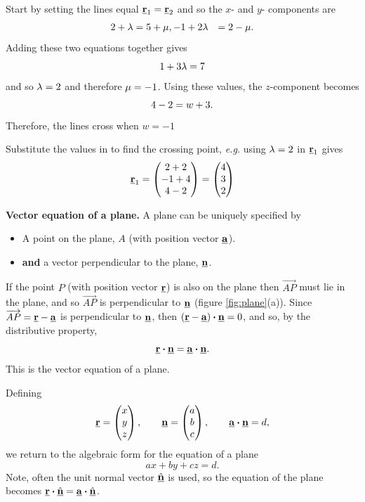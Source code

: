 \begin{solution}
Start by setting the lines equal $\underline{\mathbf{r}}_1=\underline{\mathbf{r}}_2$ and so the $x$- and $y$- components are
\begin{align*}
    2+\lambda &= 5+\mu,
    -1+2\lambda &= 2-\mu.
\end{align*}
Adding these two equations together gives 
\[
1 + 3\lambda = 7
\]
and so $\lambda=2$ and therefore $\mu=-1$. Using these values, the $z$-component becomes
\[
4-2=w+3.
\]
Therefore, the lines cross when $w=-1$

Substitute the values in to find the crossing point, \textit{e.g.} using $\lambda=2$ in $\underline{\mathbf{r}}_1$ gives
\[
\underline{\mathbf{r}}_1
=\begin{pmatrix}2 + 2\\-1 + 4\\4 - 2\end{pmatrix}
=\begin{pmatrix}4\\3\\2\end{pmatrix}
\]
\end{solution}

\textbf{Vector equation of a plane.} A plane can be uniquely specified by
\begin{itemize}
\item A point on the plane, $A$ (with position vector $\underline{\mathbf{a}}$).
\item \textbf{and} a vector perpendicular to the plane, $\underline{\mathbf{n}}$.
\end{itemize}

If the point $P$ (with position vector $\underline{\mathbf{r}}$) is also on the plane then $\overrightarrow{AP}$ must lie in the plane, and so $\overrightarrow{AP}$ is perpendicular to $\underline{\mathbf{n}}$ (figure \ref{fig:plane}(a)). Since $\overrightarrow{AP}=\underline{\mathbf{r}}-\underline{\mathbf{a}}$ is perpendicular to $\underline{\mathbf{n}}$, then $(\underline{\mathbf{r}}-\underline{\mathbf{a}})\boldsymbol{\cdot}\underline{\mathbf{n}}=0$, and so, by the distributive property,
\[
\underline{\mathbf{r}}\boldsymbol{\cdot}\underline{\mathbf{n}}
=\underline{\mathbf{a}}\boldsymbol{\cdot}\underline{\mathbf{n}}.
\]
This is the vector equation of a plane.

Defining
\[
\underline{\mathbf{r}}=\begin{pmatrix}x\\y\\z\end{pmatrix},
\qquad
\underline{\mathbf{n}}=\begin{pmatrix}a\\b\\c\end{pmatrix},
\qquad
\underline{\mathbf{a}}\boldsymbol{\cdot}\underline{\mathbf{n}}=d,
\]
we return to the algebraic form for the equation of a plane
\[
ax+by+cz=d.
\]
Note, often the unit normal vector $\hat{\underline{\mathbf{n}}}$ is used, so the equation of the plane becomes $\underline{\mathbf{r}}\boldsymbol{\cdot}\hat{\underline{\mathbf{n}}}
=\underline{\mathbf{a}}\boldsymbol{\cdot}\hat{\underline{\mathbf{n}}}$.

